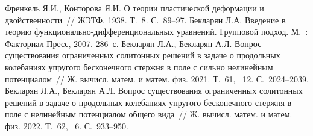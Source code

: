 \begin{thebibliography}{9} %
 Френкель Я.И., Конторова Я.И. О теории пластической деформации и двойственности~// ЖЭТФ.  1938.  Т.~8.  С.~89--97.
 Бекларян Л.А. Введение в теорию функ\-ци\-о\-наль\-но-диф\-фе\-рен\-ци\-о\-наль\-ных уравнений. Групповой подход.  М.~: Факториал Пресс, 2007.  286~с.
 Бекларян Л.А., Бекларян А.Л.  Вопрос существования ограниченных солитонных решений в задаче о продольных колебаниях упругого бесконечного стержня в поле с сильно нелинейным потенциалом~// Ж. вычисл. матем. и матем. физ. 2021. Т.~61, \textnumero~12. С.~2024--2039.
 Бекларян Л.А., Бекларян А.Л. Вопрос существования ограниченных солитонных решений в задаче о продольных колебаниях упругого бесконечного стержня в поле с нелинейным потенциалом общего вида~// Ж. вычисл. матем. и матем. физ.  2022.  Т.~62, \textnumero~6. С.~933--950.
\end{thebibliography}





%

